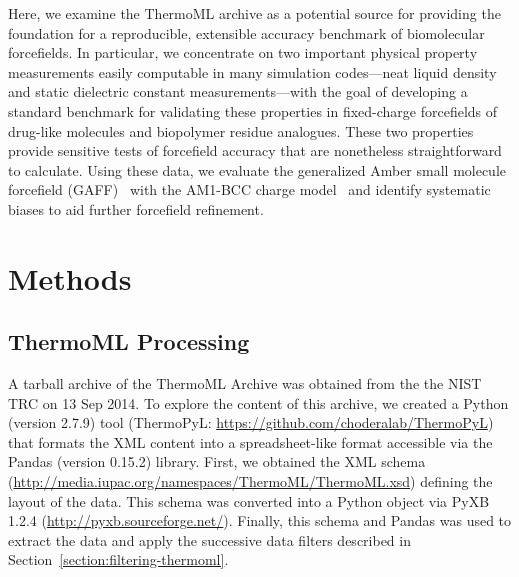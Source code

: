 \documentclass[aps,pre,twocolumn,nofootinbib,superscriptaddress,linenumbers]{revtex4-1}
\begin{document}
Here, we examine the ThermoML archive as a potential source for providing the foundation for a reproducible, extensible accuracy benchmark of biomolecular forcefields.
In particular, we concentrate on two important physical property measurements easily computable in many simulation codes---neat liquid density and static dielectric constant measurements---with the goal of developing a standard benchmark for validating these properties in fixed-charge forcefields of drug-like molecules and biopolymer residue analogues.  
These two properties provide sensitive tests of forcefield accuracy that are nonetheless straightforward to calculate.  
Using these data, we evaluate the generalized Amber small molecule forcefield (GAFF)~\cite{gaff} with the AM1-BCC charge model~\cite{am1bcc1,am1bcc2} and identify systematic biases to aid further forcefield refinement.





\section{Methods}

\subsection{ThermoML Processing}

A tarball archive of the ThermoML Archive was obtained from the the NIST TRC on 13 Sep 2014.
To explore the content of this archive, we created a Python (version 2.7.9) tool (ThermoPyL: \url{https://github.com/choderalab/ThermoPyL}) that formats the XML content into a spreadsheet-like format accessible via the Pandas (version 0.15.2) library.  
First, we obtained the XML schema (\url{http://media.iupac.org/namespaces/ThermoML/ThermoML.xsd}) defining the layout of the data.
This schema was converted into a Python object via PyXB 1.2.4 (\url{http://pyxb.sourceforge.net/}).
Finally, this schema and Pandas was used to extract the data and apply the successive data filters described in Section~\ref{section:filtering-thermoml}.  
\end{document}
